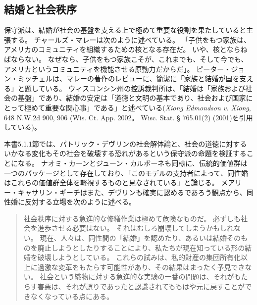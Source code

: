 \documentclass[paper=a4,book,openany]{jlreq}
\newcommand{\ig}[1]{}           %
\begin{document}
\subsection{結婚と社会秩序}

保守派は、結婚が社会の基盤を支える上で極めて重要な役割を果たしていると主張する。
チャールズ・マレーは次のように述べている。
「子供をもつ家族は、アメリカのコミュニティを組織するための核となる存在だ。
いや、核とならねばならない。
なぜなら、子供をもつ家族こそが、これまでも、そして今でも、アメリカというコミュニティを機能させる原動力だからだ」\citep[p.169]{murray12:_comin_apart}。
ピーター・ジョン・ミッチェル\ig{Peter Jon Mitchell}は、マレーの著作のレビューに、簡潔に「家族と結婚が国を支える」と題している\citep{mitchell12:_famil_marriag_hold_count_toget}。
ウィスコンシン州の控訴裁判所は、「結婚は「家族および社会の基盤」であり、結婚の安定は「道徳と文明の基本であり、社会および国家にとって極めて重要な関心事」である」と述べている(\emph{Xiong Edmondson v. Xiong}, 648 N.W.2d 900, 906 (Wis. Ct. App. 2002。
Wisc. Stat.  § 765.01(2) (2001)を引用している)。

本書5.1.1節では、パトリック・デヴリンの社会解体論と、社会の道徳に対するいかなる変化もその社会を破壊する恐れがあるという保守派の命題を検証することになる。
ナオミ・カーンとジューン・カルボーネも同様に、伝統的価値群は一つのパッケージとして存在しており、「このモデルの支持者によって、同性婚はこれらの価値群全体を軽視するものと見なされている」と論じる\citep[pp.1--2]{cahn10:_red_famil}。
メアリー・キャサリン・ギーチはまた、デヴリン\ig{Patrick Devlin}も確実に認めるであろう観点から、同性婚に反対する立場を次のように述べる。

\begin{quote}
社会秩序に対する急進的な修繕作業は極めて危険なものだ。
必ずしも社会を進歩させる必要はない。
それはむしろ崩壊してしまうかもしれない。
現在、人々は、同性間の「結婚」を認めたり、あるいは結婚そのものを廃止しようとしたりすることにより、私たちが現在知っている形の結婚を破壊しようとしている。
これらの試みは、私的財産の集団所有化以上に過激な変革をもたらす可能性があり、その結果はまったく予見できない。
社会という織物に対する急進的な実験の一番の問題は、それがもたらす害悪は、それが誤りであったと認識されてももはや元に戻すことができなくなっている点にある。
\citep[p.532]{geach08:_lying_body}

\end{quote}
\end{document}
